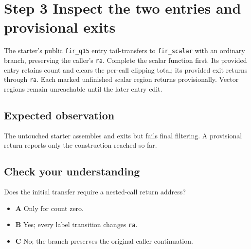 \section{Step 3 Inspect the two entries and provisional exits}\label{fir-s03}

The starter’s public \texttt{fir\_q15} entry tail-transfers to \texttt{fir\_scalar} with an ordinary branch, preserving the caller’s \texttt{ra}. Complete the scalar function first. Its provided entry retains count and clears the per-call clipping total; its provided exit returns through \texttt{ra}. Each marked unfinished scalar region returns provisionally. Vector regions remain unreachable until the later entry edit.

\subsection{Expected observation}
The untouched starter assembles and exits but fails final filtering. A provisional return reports only the construction reached so far.

\subsection{Check your understanding}
Does the initial transfer require a nested-call return address?

\begin{itemize}
  \item \textbf{A} Only for count zero.
  \item \textbf{B} Yes; every label transition changes \texttt{ra}.
  \item \textbf{C} No; the branch preserves the original caller continuation.
\end{itemize}
